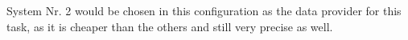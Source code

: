 \documentclass[11pt, a4paper, BCOR12mm, headexclude, footexclude, twoside,%
openright]{scrartcl}
\numberwithin{equation}{section}
\numberwithin{figure}{section}
\numberwithin{table}{section}
\begin{document}
System Nr. 2 would be chosen in this configuration as the data provider for this task, as it is cheaper than the others and still very precise as well.


\end{document}
